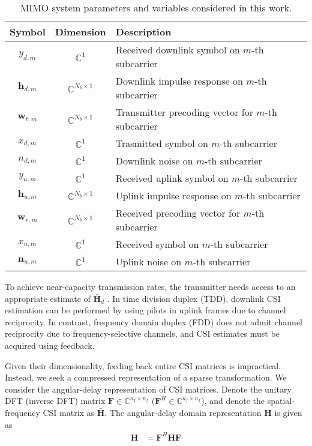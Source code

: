 \begin{table}[]
\centering
\caption{MIMO system parameters and variables considered in this work.}
\label{tab:cost-params}
\begin{tabular}{c|c|l}
\toprule
\textbf{Symbol}   & \textbf{Dimension}          & \textbf{Description} \\ \midrule
$y_{d,m}$ 		  & $\mathbb{C}^{1}$ 			& Received downlink symbol on $m$-th subcarrier  \\ \hline
$\mathbf h_{d,m}$ & $\mathbb{C}^{N_b \times 1}$ & Downlink impulse response on $m$-th subcarrier  \\ \hline
$\mathbf w_{t,m}$ & $\mathbb{C}^{N_b \times 1}$ & Transmitter precoding vector for $m$-th subcarrier  \\ \hline
$x_{d,m}$ 		  & $\mathbb{C}^{1}$ 			& Trasmitted symbol on $m$-th subcarrier  \\ \hline
$n_{d,m}$ 		  & $\mathbb{C}^{1}$ 			& Downlink noise on $m$-th subcarrier  \\ \hline
$y_{u,m}$ 		  & $\mathbb{C}^{1}$ 			& Received uplink symbol on $m$-th subcarrier  \\ \hline
$\mathbf h_{u,m}$ & $\mathbb{C}^{N_b \times 1}$ & Uplink impulse response on $m$-th subcarrier  \\ \hline
$\mathbf w_{r,m}$ & $\mathbb{C}^{N_b \times 1}$ & Received precoding vector for $m$-th subcarrier  \\ \hline
$x_{u,m}$ 		  & $\mathbb{C}^{1}$ 			& Received symbol on $m$-th subcarrier  \\ \hline
$\mathbf n_{u,m}$ & $\mathbb{C}^{1}$ 			& Uplink noise on $m$-th subcarrier  \\ \hline
\end{tabular}
\end{table}
To achieve near-capacity transmission rates, the transmitter needs access to an appropriate estimate of $\bar{\mathbf H}_d$ \cite{ref:goldsmith2003capacity}. In time division duplex (TDD), downlink CSI estimation can be performed by using pilots in uplink frames due to channel reciprocity. In contrast, frequency domain duplex (FDD) does not admit channel reciprocity due to frequency-selective channels, and CSI estimates must be acquired using feedback.

Given their dimensionality, feeding back entire CSI matrices is impractical. Instead, we seek a compressed representation of a sparse transformation. We consider the angular-delay representation of CSI matrices. Denote the unitary DFT (inverse DFT) matrix $\mathbf F \in \mathbb C^{n_f \times n_f}$ ($\mathbf F^H \in \mathbb C^{n_f \times n_f}$), and denote the spatial-frequency CSI matrix as $\bar{\mathbf H}$. The angular-delay domain representation $\mathbf H$ is given as
\begin{align*}
	\mathbf H &= \mathbf F^H \bar{\mathbf H} \mathbf F
\end{align*}

